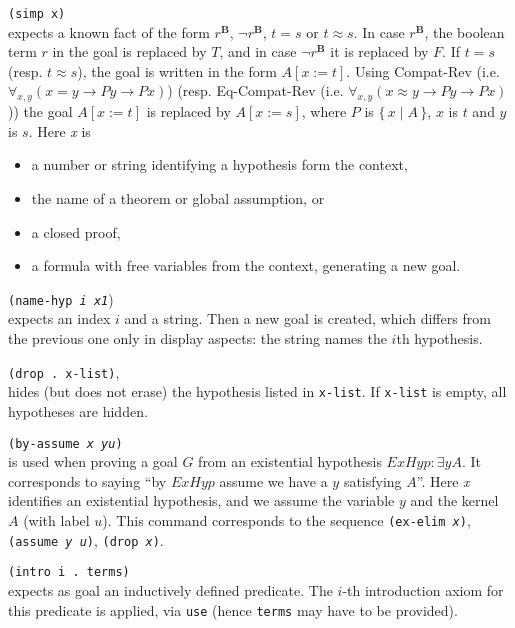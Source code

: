 \documentclass[12pt]{amsart}
\newcommand{\ex}{\exists} %
\newcommand{\typeB}{\mathbf{B}}
\newcommand{\inquotes}[1]{``#1''}
\newcommand{\set}[2]{\{\,#1\mid#2\,\}}
\newcommand{\subst}[3]{#1[#2:= #3]}
\begin{document}
\texttt{(simp x)}\\
expects a known fact of the form $r^{\typeB}$, $\lnot r^{\typeB}$,
$t=s$ or $t \approx s$.  In case $r^{\typeB}$, the boolean term $r$ in
the goal is replaced by $T$, and in case $\lnot r^{\typeB}$ it is
replaced by $F$.  If $t=s$ (resp. $t \approx s$), the goal is written
in the form $\subst{A}{x}{t}$.  Using Compat-Rev (i.e. $\forall_{x,y}
(x=y \to P y \to P x)$) (resp. Eq-Compat-Rev (i.e. $\forall_{x,y} (x
\approx y \to P y \to P x)$)) the goal $\subst{A}{x}{t}$ is replaced
by $\subst{A}{x}{s}$, where $P$ is $\set{x}{A}$, $x$ is $t$ and $y$ is
$s$.  Here \textsl{x} is
\begin{itemize}
\item a number or string identifying a hypothesis form the context,
\item the name of a theorem or global assumption, or
\item a closed proof,
\item a formula with free variables from the context, generating a new
  goal.
\end{itemize}

\texttt{(name-hyp \textsl{i x1}})\\
expects an index $i$ and a string.  Then a new goal is created, which
differs from the previous one only in display aspects:
the string names the $i$th hypothesis.

\texttt{(drop . x-list)},\\
hides (but does not erase) the hypothesis listed in \texttt{x-list}.
If \texttt{x-list} is empty, all hypotheses are hidden.

\texttt{(by-assume \textsl{x} \textsl{y}\textsl{u})}%
\\
is used when proving a goal $G$ from an existential hypothesis $ExHyp
\colon \ex y A$.  It corresponds to saying \inquotes{by $ExHyp$ assume
  we have a $y$ satisfying $A$}.  Here \textsl{x} identifies an
existential hypothesis, and we assume the variable $y$ and the kernel
$A$ (with label $u$). This command corresponds to the sequence
\texttt{(ex-elim \textsl{x})}, \texttt{(assume \textsl{y}
  \textsl{u})}, \texttt{(drop \textsl{x})}.

\texttt{(intro i .\ terms)}\\
expects as goal an inductively defined predicate.  The $i$-th
introduction axiom for this predicate is applied, via \texttt{use}
(hence \texttt{terms} may have to be provided).
\end{document}
